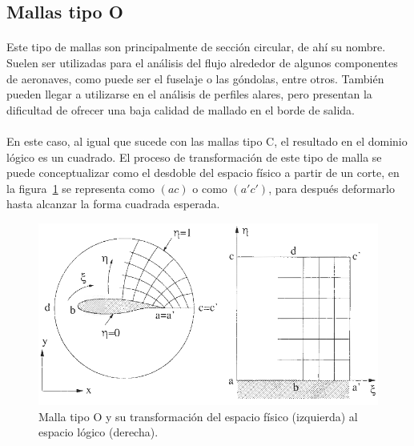 \documentclass[letterpaper, openright, 12pt]{book}
\begin{document}
    \subsection{Mallas tipo O}
    \paragraph*{}
    Este tipo de mallas son principalmente de sección circular, de ahí su
    nombre. Suelen ser utilizadas para el análisis del flujo alrededor de
    algunos componentes de aeronaves, como puede ser el fuselaje o las
    góndolas, entre otros.\cite{vladimir-grid} También pueden llegar a
    utilizarse en el análisis de perfiles alares, pero presentan la
    dificultad de ofrecer una baja calidad de mallado en el borde de
    salida.~\cite{blazek}\cite{best-practices-grid-generation}

    \paragraph*{}
    En este caso, al igual que sucede con las mallas tipo C, el resultado en
    el dominio lógico es un cuadrado. El proceso de transformación de este
    tipo de malla se puede conceptualizar como el desdoble del espacio
    físico a partir de un corte, en la figura~\ref{fig:malla-o} se
    representa como $(ac)$ o como $(a'c')$, para después deformarlo hasta
    alcanzar la forma cuadrada esperada.
    \begin{figure}[htbp!]
        \centering
            \includegraphics[keepaspectratio, width=170mm]{./img/malla-o}
            \captionsetup{justification=centering, margin=2cm}
            \caption[Malla tipo O]{Malla tipo O y su transformación del
            espacio físico (izquierda) al espacio lógico
            (derecha).~\cite{blazek}}
        \label{fig:malla-o}
    \end{figure}
\end{document}
